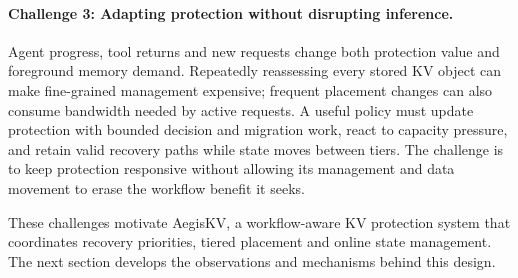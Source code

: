 \paragraph{Challenge 3: Adapting protection without disrupting inference.}
Agent progress, tool returns and new requests change both protection
value and foreground memory demand. Repeatedly reassessing every stored
KV object can make fine-grained management expensive; frequent placement
changes can also consume bandwidth needed by active requests.
A useful policy must update protection with bounded decision and
migration work, react to capacity pressure, and retain valid recovery
paths while state moves between tiers. The challenge is to keep
protection responsive without allowing its management and data movement
to erase the workflow benefit it seeks.

\label{sec:motivation-goals}
These challenges motivate AegisKV, a workflow-aware KV protection system
that coordinates recovery priorities, tiered placement and online state
management. The next section develops the observations and mechanisms
behind this design.
